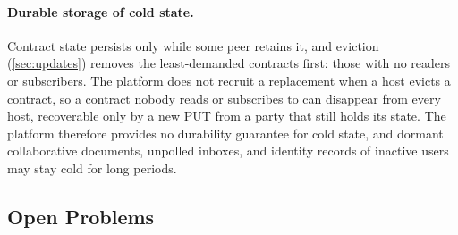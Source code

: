 \paragraph{Durable storage of cold state.} Contract state persists only while some peer retains it, and eviction (\cref{sec:updates}) removes the least-demanded contracts first: those with no readers or subscribers. The platform does not recruit a replacement when a host evicts a contract, so a contract nobody reads or subscribes to can disappear from every host, recoverable only by a new \textsf{PUT} from a party that still holds its state. The platform therefore provides no durability guarantee for cold state, and dormant collaborative documents, unpolled inboxes, and identity records of inactive users may stay cold for long periods.

\subsection{Open Problems}

